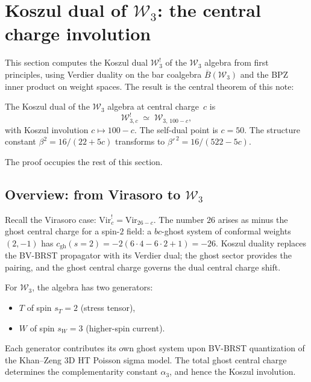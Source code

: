 \documentclass[11pt]{article}
\newcommand{\cW}{\mathcal{W}}
\newcommand{\barB}{\overline{B}}
\begin{document}

\section{Koszul dual of $\cW_3$: the central charge involution}
\label{sec:koszul-dual-W3}

This section computes the Koszul dual $\cW_3^!$ of the $\cW_3$
algebra from first principles, using Verdier duality on the bar
coalgebra $\barB(\cW_3)$ and the BPZ inner product on weight
spaces.  The result is the central theorem of this note:

\begin{theorem}[Koszul dual of $\cW_3$; proved here]
\label{thm:koszul-dual-W3}
The Koszul dual of the $\cW_3$ algebra at central charge~$c$ is
\begin{equation}\label{eq:W3-koszul-dual}
\boxed{\;
\cW_{3,c}^!
\;\simeq\;
\cW_{3,\,100-c},
\;}
\end{equation}
with Koszul involution $c \mapsto 100 - c$.  The self-dual point
is $c = 50$.  The structure constant $\beta^2 = 16/(22+5c)$
transforms to $\beta'^{\,2} = 16/(522 - 5c)$.
\end{theorem}

The proof occupies the rest of this section.

\subsection{Overview: from Virasoro to $\cW_3$}

Recall the Virasoro case: $\mathrm{Vir}_c^! = \mathrm{Vir}_{26-c}$.
The number $26$ arises as minus the ghost central charge for a
spin-$2$ field: a $bc$-ghost system of conformal weights $(2, -1)$
has $c_{\mathrm{gh}}(s=2) = -2(6 \cdot 4 - 6 \cdot 2 + 1) = -26$.
Koszul duality replaces the BV-BRST propagator with its Verdier
dual; the ghost sector provides the pairing, and the ghost central
charge governs the dual central charge shift.

For $\cW_3$, the algebra has two generators:
\begin{itemize}
\item $T$ of spin $s_T = 2$ (stress tensor),
\item $W$ of spin $s_W = 3$ (higher-spin current).
\end{itemize}
Each generator contributes its own ghost system upon BV-BRST
quantization of the Khan--Zeng 3D HT Poisson sigma model.  The
total ghost central charge determines the complementarity
constant $\alpha_3$, and hence the Koszul involution.
\end{document}
